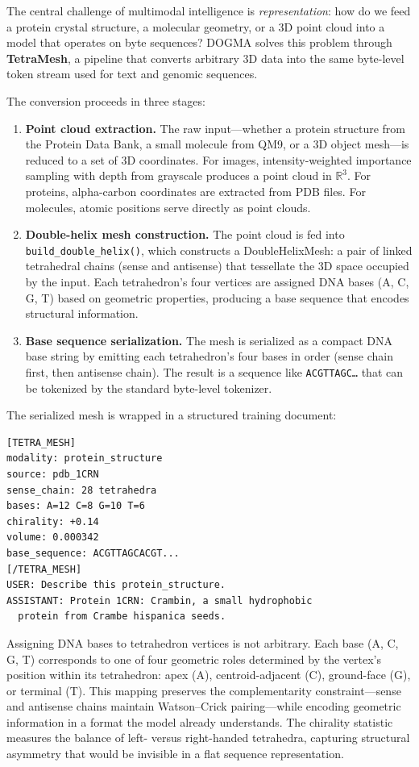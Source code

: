 The central challenge of multimodal intelligence is \emph{representation}: how do we feed a protein crystal structure, a molecular geometry, or a 3D point cloud into a model that operates on byte sequences? DOGMA solves this problem through \textbf{TetraMesh}, a pipeline that converts arbitrary 3D data into the same byte-level token stream used for text and genomic sequences.

The conversion proceeds in three stages:
\begin{enumerate}[leftmargin=1.8em]
  \item \textbf{Point cloud extraction.} The raw input---whether a protein structure from the Protein Data Bank, a small molecule from QM9, or a 3D object mesh---is reduced to a set of 3D coordinates. For images, intensity-weighted importance sampling with depth from grayscale produces a point cloud in $\mathbb{R}^3$. For proteins, alpha-carbon coordinates are extracted from PDB files. For molecules, atomic positions serve directly as point clouds.

  \item \textbf{Double-helix mesh construction.} The point cloud is fed into \texttt{build\_double\_helix()}, which constructs a DoubleHelixMesh: a pair of linked tetrahedral chains (sense and antisense) that tessellate the 3D space occupied by the input. Each tetrahedron's four vertices are assigned DNA bases (A, C, G, T) based on geometric properties, producing a base sequence that encodes structural information.

  \item \textbf{Base sequence serialization.} The mesh is serialized as a compact DNA base string by emitting each tetrahedron's four bases in order (sense chain first, then antisense chain). The result is a sequence like \texttt{ACGTTAGC\ldots} that can be tokenized by the standard byte-level tokenizer.
\end{enumerate}

The serialized mesh is wrapped in a structured training document:
\begin{verbatim}
[TETRA_MESH]
modality: protein_structure
source: pdb_1CRN
sense_chain: 28 tetrahedra
bases: A=12 C=8 G=10 T=6
chirality: +0.14
volume: 0.000342
base_sequence: ACGTTAGCACGT...
[/TETRA_MESH]
USER: Describe this protein_structure.
ASSISTANT: Protein 1CRN: Crambin, a small hydrophobic
  protein from Crambe hispanica seeds.
\end{verbatim}

\begin{bioinsight}
Assigning DNA bases to tetrahedron vertices is not arbitrary. Each base (A, C, G, T) corresponds to one of four geometric roles determined by the vertex's position within its tetrahedron: apex (A), centroid-adjacent (C), ground-face (G), or terminal (T). This mapping preserves the complementarity constraint---sense and antisense chains maintain Watson--Crick pairing---while encoding geometric information in a format the model already understands. The chirality statistic measures the balance of left- versus right-handed tetrahedra, capturing structural asymmetry that would be invisible in a flat sequence representation.
\end{bioinsight}

